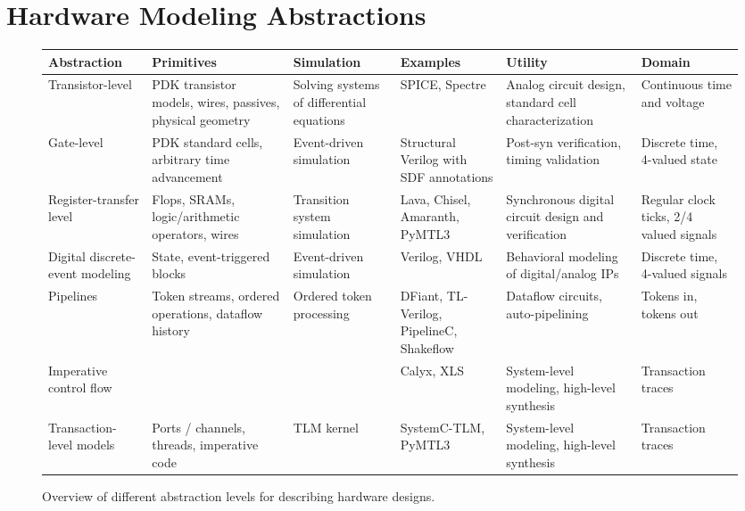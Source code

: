\documentclass[sigplan,review,nonacm]{acmart}
\begin{document}

\maketitle

\section{Hardware Modeling Abstractions}

\begin{figure*}[!hbt]
\small
\begin{tabular}{>{\raggedright\arraybackslash}p{2cm}p{3cm}p{2cm}p{3cm}p{3cm}p{2cm}}\toprule
\textbf{Abstraction} & \textbf{Primitives} & \textbf{Simulation} & \textbf{Examples} & \textbf{Utility} & \textbf{Domain} \\\midrule
Transistor-level & PDK transistor models, wires, passives, physical geometry & Solving systems of differential equations & SPICE, Spectre & Analog circuit design, standard cell characterization & Continuous time and voltage\\\midrule
Gate-level & PDK standard cells, arbitrary time advancement & Event-driven simulation & Structural Verilog with SDF annotations & Post-syn verification, timing validation & Discrete time, 4-valued state\\\midrule
Register-transfer level & Flops, SRAMs, logic/arithmetic operators, wires & Transition system simulation & Lava\cite{lava}, Chisel\cite{chisel}, Amaranth\cite{amaranth}, PyMTL3\cite{pymtl3} & Synchronous digital circuit design and verification & Regular clock ticks, 2/4 valued signals\\\midrule
Digital discrete-event modeling & State, event-triggered blocks & Event-driven simulation & Verilog, VHDL & Behavioral modeling of digital/analog IPs & Discrete time, 4-valued signals\\\midrule
Pipelines & Token streams, ordered operations, dataflow history & Ordered token processing & DFiant\cite{dfiant}, TL-Verilog\cite{tlverilog}, PipelineC\cite{pipelinec}, Shakeflow\cite{shakeflow} & Dataflow circuits, auto-pipelining & Tokens in, tokens out\\\midrule
Imperative control flow & &  & Calyx\cite{calyx}, XLS\cite{xls} & System-level modeling, high-level synthesis & Transaction traces\\\midrule
Transaction-level models & Ports / channels, threads, imperative code & TLM kernel & SystemC-TLM, PyMTL3 & System-level modeling, high-level synthesis & Transaction traces\\\bottomrule
\end{tabular}
\caption{Overview of different abstraction levels for describing hardware designs.}
\label{fig:abstractions}
\end{figure*}
\end{document}
